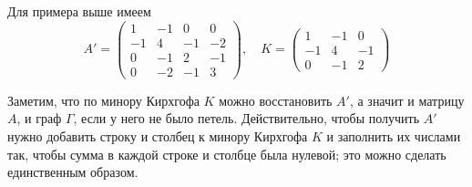 \documentclass{article}
\begin{document}
Для примера выше имеем
\[A'=\left(
\begin{matrix}
1&-1&0&0
\\
-1&4&-1&-2
\\
0&-1&2&-1
\\
0&-2&-1&3
\end{matrix}
\right),
\quad 
K=\left(
\begin{matrix}
1&-1&0
\\
-1&4&-1
\\
0&-1&2
\end{matrix}
\right)\]

Заметим, что по минору Кирхгофа $K$ можно восстановить $A'$, а значит и матрицу $A$, и граф $\Gamma$, если у него не было петель.
Действительно, чтобы получить $A'$ нужно добавить строку и столбец к минору Кирхгофа $K$ и заполнить их числами так, чтобы сумма в каждой строке и столбце была нулевой;
это можно сделать единственным образом.
\end{document}
